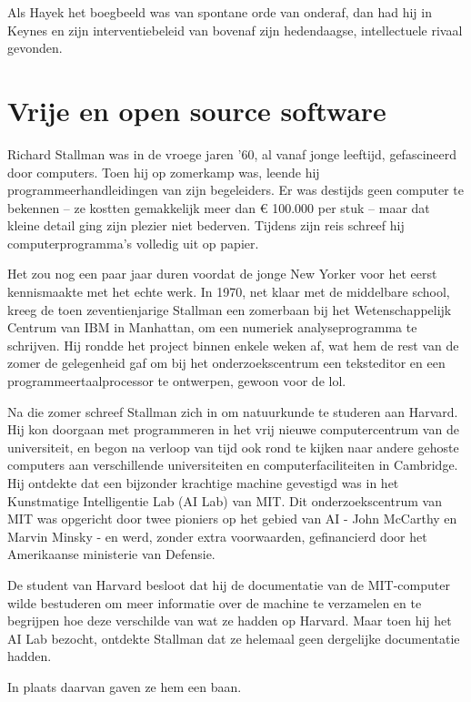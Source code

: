 \documentclass[smalldemyvopaper,11pt,twoside,onecolumn,openright,extrafontsizes,hidelinks]{memoir}
\begin{document}
Als Hayek het boegbeeld was van spontane orde van onderaf, dan had hij
in Keynes en zijn interventiebeleid van bovenaf zijn hedendaagse,
intellectuele rivaal gevonden.

\chapter{Vrije en open source
software}\label{vrije-en-open-source-software}

Richard Stallman was in de vroege jaren '60, al vanaf jonge leeftijd,
gefascineerd door computers. Toen hij op zomerkamp was, leende hij
programmeerhandleidingen van zijn begeleiders. Er was destijds geen
computer te bekennen -- ze kostten gemakkelijk meer dan € 100.000 per
stuk -- maar dat kleine detail ging zijn plezier niet bederven. Tijdens
zijn reis schreef hij computerprogramma's volledig uit op papier.

Het zou nog een paar jaar duren voordat de jonge New Yorker voor het
eerst kennismaakte met het echte werk. In 1970, net klaar met de
middelbare school, kreeg de toen zeventienjarige Stallman een zomerbaan
bij het Wetenschappelijk Centrum van IBM in Manhattan, om een numeriek
analyseprogramma te schrijven. Hij rondde het project binnen enkele
weken af, wat hem de rest van de zomer de gelegenheid gaf om bij het
onderzoekscentrum een teksteditor en een programmeertaalprocessor te
ontwerpen, gewoon voor de lol.

Na die zomer schreef Stallman zich in om natuurkunde te studeren aan
Harvard. Hij kon doorgaan met programmeren in het vrij nieuwe
computercentrum van de universiteit, en begon na verloop van tijd ook
rond te kijken naar andere gehoste computers aan verschillende
universiteiten en computerfaciliteiten in Cambridge. Hij ontdekte dat
een bijzonder krachtige machine gevestigd was in het Kunstmatige
Intelligentie Lab (AI Lab) van MIT. Dit onderzoekscentrum van MIT was
opgericht door twee pioniers op het gebied van AI - John McCarthy en
Marvin Minsky - en werd, zonder extra voorwaarden, gefinancierd door het
Amerikaanse ministerie van Defensie.

De student van Harvard besloot dat hij de documentatie van de
MIT-computer wilde bestuderen om meer informatie over de machine te
verzamelen en te begrijpen hoe deze verschilde van wat ze hadden op
Harvard. Maar toen hij het AI Lab bezocht, ontdekte Stallman dat ze
helemaal geen dergelijke documentatie hadden.

In plaats daarvan gaven ze hem een baan.
\end{document}

